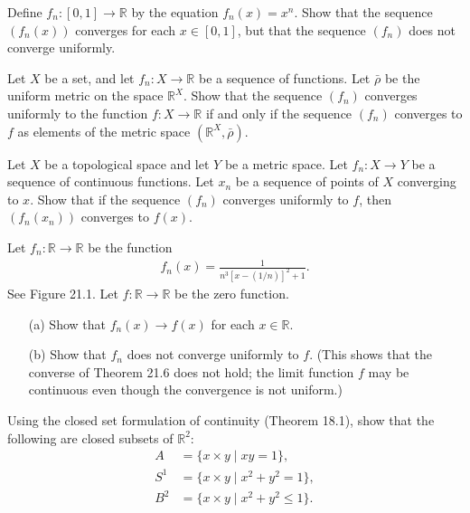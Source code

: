   \begin{exercise}[Munkres 21.6]
    Define $f_n : [0, 1] \to \mathbb{R}$ by the equation $f_n(x) = x^n$. Show that the sequence $(f_n(x))$ converges for each $x \in [0, 1]$, but that the sequence $(f_n)$ does not converge uniformly.
  \end{exercise}

  \begin{exercise}[Munkres 21.7]
    Let $X$ be a set, and let $f_n : X \to \mathbb{R}$ be a sequence of functions. Let $\bar{\rho}$ be the uniform metric on the space $\mathbb{R}^X$. Show that the sequence $(f_n)$ converges uniformly to the function $f : X \to \mathbb{R}$ if and only if the sequence $(f_n)$ converges to $f$ as elements of the metric space $(\mathbb{R}^X, \bar{\rho})$.
  \end{exercise}

  \begin{exercise}[Munkres 21.8]
    Let $X$ be a topological space and let $Y$ be a metric space. Let $f_n : X \to Y$ be a sequence of continuous functions. Let $x_n$ be a sequence of points of $X$ converging to $x$. Show that if the sequence $(f_n)$ converges uniformly to $f$, then $(f_n(x_n))$ converges to $f(x)$.
  \end{exercise}

  \begin{exercise}[Munkres 21.9]
    Let $f_n : \mathbb{R} \to \mathbb{R}$ be the function
    \begin{align*}
      f_n(x) = \frac{1}{n^3[x - (1/n)]^2 + 1}.
    \end{align*}
    See Figure 21.1. Let $f : \mathbb{R} \to \mathbb{R}$ be the zero function.
    \begin{enumerate} 
      \item[(a)] Show that $f_n(x) \to f(x)$ for each $x \in \mathbb{R}$.
      \item[(b)] Show that $f_n$ does not converge uniformly to $f$. (This shows that the converse of Theorem 21.6 does not hold; the limit function $f$ may be continuous even though the convergence is not uniform.)
    \end{enumerate}
  \end{exercise}

  \begin{exercise}[Munkres 21.10]
    Using the closed set formulation of continuity (Theorem 18.1), show that the following are closed subsets of $\mathbb{R}^2$:
    \begin{align*}
      A &= \{x \times y \mid xy = 1\}, \\
      S^1 &= \{x \times y \mid x^2 + y^2 = 1\}, \\
      B^2 &= \{x \times y \mid x^2 + y^2 \leq 1\}.
    \end{align*}
  \end{exercise}


